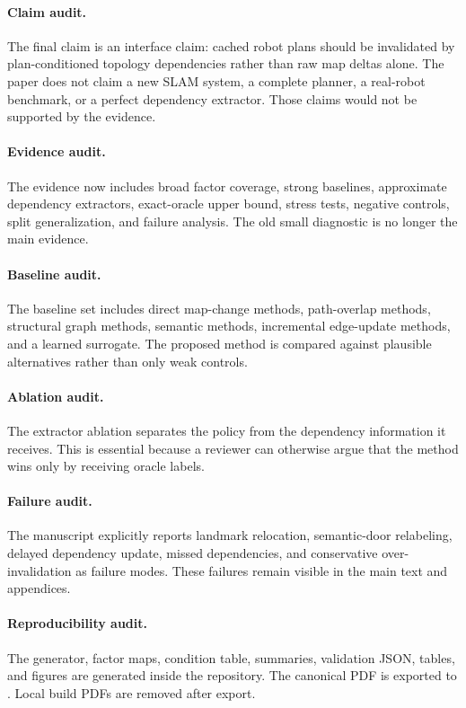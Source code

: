 \documentclass{article}
\begin{document}
\paragraph{Claim audit.}
The final claim is an interface claim: cached robot plans should be invalidated by plan-conditioned topology dependencies rather than raw map deltas alone. The paper does not claim a new SLAM system, a complete planner, a real-robot benchmark, or a perfect dependency extractor. Those claims would not be supported by the evidence.

\paragraph{Evidence audit.}
The evidence now includes broad factor coverage, strong baselines, approximate dependency extractors, exact-oracle upper bound, stress tests, negative controls, split generalization, and failure analysis. The old small diagnostic is no longer the main evidence.

\paragraph{Baseline audit.}
The baseline set includes direct map-change methods, path-overlap methods, structural graph methods, semantic methods, incremental edge-update methods, and a learned surrogate. The proposed method is compared against plausible alternatives rather than only weak controls.

\paragraph{Ablation audit.}
The extractor ablation separates the policy from the dependency information it receives. This is essential because a reviewer can otherwise argue that the method wins only by receiving oracle labels.

\paragraph{Failure audit.}
The manuscript explicitly reports landmark relocation, semantic-door relabeling, delayed dependency update, missed dependencies, and conservative over-invalidation as failure modes. These failures remain visible in the main text and appendices.

\paragraph{Reproducibility audit.}
The generator, factor maps, condition table, summaries, validation JSON, tables, and figures are generated inside the repository. The canonical PDF is exported to . Local build PDFs are removed after export.
\end{document}
